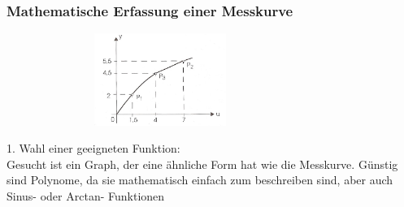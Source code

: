 	\subsubsection{Mathematische Erfassung einer Messkurve}

	\begin{floatingfigure}[r]{12cm}
    \includegraphics[width=10cm,height=3cm]{./bilder/KennlinieMitStuetzwerten.jpg}
	\end{floatingfigure}
   	
     	1. Wahl einer geeigneten Funktion:\\
     	Gesucht ist ein Graph, der eine ähnliche Form
		hat wie die Messkurve. Günstig sind Polynome, da sie mathematisch einfach zum
		beschreiben sind, aber auch Sinus- oder Arctan- Funktionen	\\ 
        \\

